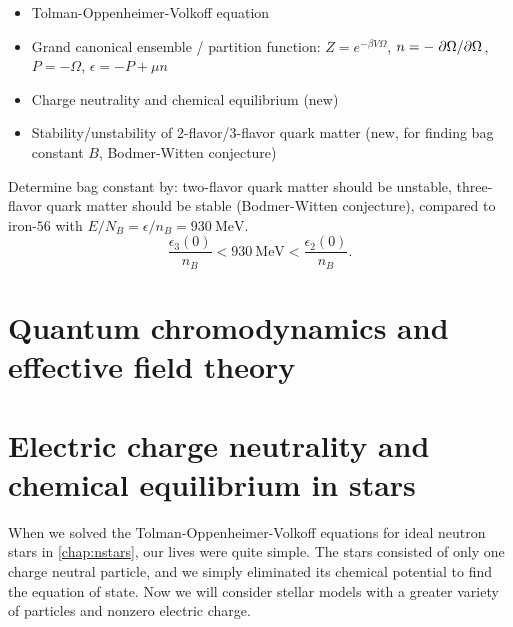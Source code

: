 \begin{itemize}
\item Tolman-Oppenheimer-Volkoff equation
\item Grand canonical ensemble / partition function: $Z = e^{-\beta V \Omega}$, $n = -\pdv{\Omega}/{\Omega}$, $P = -\Omega$, $\epsilon = -P + \mu n$
\item Charge neutrality and chemical equilibrium (new)
\item Stability/unstability of 2-flavor/3-flavor quark matter (new, for finding bag constant $B$, Bodmer-Witten conjecture)
\end{itemize}


Determine bag constant by:
two-flavor quark matter should be unstable,
three-flavor quark matter should be stable (Bodmer-Witten conjecture),
compared to iron-$56$ with $E/N_B = \epsilon/n_B = \SI{930}{\mega\electronvolt}$.
\begin{equation}
	\frac{\epsilon_3(0)}{n_B} < \SI{930}{\mega\electronvolt} < \frac{\epsilon_2(0)}{n_B} .
\label{eq:lsm:bag_stability}
\end{equation}




\section{Quantum chromodynamics and effective field theory}


\section{Electric charge neutrality and chemical equilibrium in stars}


When we solved the Tolman-Oppenheimer-Volkoff equations for ideal neutron stars in \cref{chap:nstars}, our lives were quite simple.
The stars consisted of only one charge neutral particle, and we simply eliminated its chemical potential to find the equation of state.
Now we will consider stellar models with a greater variety of particles and nonzero electric charge.

